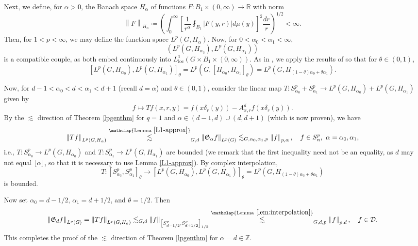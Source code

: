 \documentclass[11pt,reqno]{amsart}
\newcommand{\1}{\mathbf 1}
\begin{document}
Next, we define, for $\alpha>0$, the Banach space $H_\alpha$ of functions $F:B_1\times\left(0,\infty\right)\to\mathbb{R}$ with norm
\[
\left\|F\right\|_{H_\alpha}\coloneqq \left(\int_0^\infty \left[\frac{1}{r^\alpha}\fint_{B_1}\left|F\left(y,r\right)\right|d\mu\left(y\right)\right]^2\frac{dr}{r}\right)^{1/2}<\infty.
\]
Then, for $1<p<\infty$, we may define the function space $L^p\left(G,H_\alpha\right)$. Now, for $0<\alpha_0<\alpha_1<\infty$,
\[
\left(L^p\left(G,H_{\alpha_0}\right),L^p\left(G,H_{\alpha_1}\right)\right)
\]
is a compatible couple, as both embed continuously into $L_\mathrm{loc}^1\left(G\times B_1\times \left(0,\infty\right)\right)$. As in \cite{dorronsoro1985characterization,fassler2020dorronsoro}, we apply the results of \cite[p. 107, 121]{bergh2012interpolation} so that for $\theta\in \left(0,1\right)$,
\[
\left[L^p\left(G,H_{\alpha_0}\right),L^p\left(G,H_{\alpha_1}\right)\right]_\theta = L^p\left(G,\left[H_{\alpha_0},H_{\alpha_1}\right]_\theta\right)=L^p\left(G,H_{\left(1-\theta\right)\alpha_0+\theta\alpha_1}\right).
\]

Now, for $d-1<\alpha_0<d<\alpha_1<d+1$ (recall $d=\alpha$) and $\theta\in \left(0,1\right)$, consider the linear map $T:S^p_{\alpha_0}+S^p_{\alpha_1}\to L^p\left(G,H_{\alpha_0}\right)+L^p\left(G,H_{\alpha_1}\right)$ given by
\[
f\mapsto Tf\left(x,r,y\right)=f\left(x\delta_r\left(y\right)\right)-A^{d}_{x,r}f\left(x\delta_r\left(y\right)\right).
\]
By the $\lesssim$ direction of Theorem \ref{lpgenthm} for $q=1$ and $\alpha\in \left(d-1,d\right)\cup \left(d,d+1\right)$ (which is now proven), we have
\[
\left\|Tf\right\|_{L^p\left(G,H_{\alpha}\right)}\stackrel{\mathclap{\mathrm{Lemma~}\ref{L1-approx}}}{\lesssim}_{G,d} \left\|\mathfrak{G}_{\alpha} f\right\|_{L^p\left(G\right)}\lesssim_{G,\alpha_0,\alpha_1,p} \left\|f\right\|_{p,\alpha},\quad f\in S^p_{\alpha},~\alpha=\alpha_0,\alpha_1,
\]
i.e., $T:S^p_{\alpha_0}\to L^p\left(G,H_{\alpha_0}\right)$ and $T:S^p_{\alpha_1}\to L^p\left(G,H_{\alpha_1}\right)$ are bounded (we remark that the first inequality need not be an equality, as $d$ may not equal $\lfloor\alpha\rfloor$, so that it is necessary to use Lemma \ref{L1-approx}). By complex interpolation,
\[
T:\left[S^p_{\alpha_0},S^p_{\alpha_1}\right]_\theta \to \left[L^p\left(G,H_{\alpha_0}\right),L^p\left(G,H_{\alpha_1}\right)\right]_\theta=L^p\left(G,H_{\left(1-\theta\right)\alpha_0+\theta\alpha_1}\right)
\]
is bounded.

Now set $\alpha_0=d-1/2$, $\alpha_1=d+1/2$, and $\theta=1/2$. Then
\[
\left\|\mathfrak{G}_d f\right\|_{L^p\left(G\right)}=\left\|Tf\right\|_{L^p\left(G,H_d\right)}\lesssim_{G,d} \left\|f\right\|_{\left[S^p_{d-1/2},S^p_{d+1/2}\right]_{1/2}}\stackrel{\mathclap{\mathrm{Lemma~}\ref{lem:interpolation}}}{\lesssim}_{G,d,p}\left\|f\right\|_{p,d},\quad f\in \mathcal{D}.
\]
This completes the proof of the $\lesssim$ direction of Theorem \ref{lpgenthm} for $\alpha=d\in \mathbb{Z}$.
\end{document}
